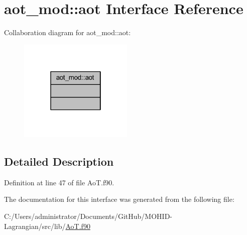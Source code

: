 \hypertarget{interfaceaot__mod_1_1aot}{}\section{aot\+\_\+mod\+:\+:aot Interface Reference}
\label{interfaceaot__mod_1_1aot}


Collaboration diagram for aot\+\_\+mod\+:\+:aot\+:
\nopagebreak
\begin{figure}[H]
\begin{center}
\leavevmode
\includegraphics[width=154pt]{interfaceaot__mod_1_1aot__coll__graph}
\end{center}
\end{figure}


\subsection{Detailed Description}


Definition at line 47 of file Ao\+T.\+f90.



The documentation for this interface was generated from the following file\+:\begin{DoxyCompactItemize}
\item 
C\+:/\+Users/administrator/\+Documents/\+Git\+Hub/\+M\+O\+H\+I\+D-\/\+Lagrangian/src/lib/\mbox{\hyperlink{_ao_t_8f90}{Ao\+T.\+f90}}\end{DoxyCompactItemize}
